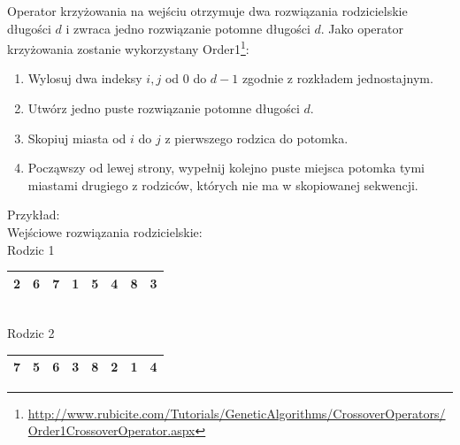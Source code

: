 \documentclass[12pt, a4paper]{article}
\begin{document}
Operator krzyżowania na wejściu otrzymuje dwa rozwiązania rodzicielskie długości $d$ i zwraca jedno rozwiązanie potomne długości $d$. 
Jako operator krzyżowania zostanie wykorzystany 
Order1\footnote{\url{http://www.rubicite.com/Tutorials/GeneticAlgorithms/CrossoverOperators/Order1CrossoverOperator.aspx}}:
\begin{enumerate}
 \item Wylosuj dwa indeksy $i, j$ od 0 do $d-1$ zgodnie z rozkładem jednostajnym.
 \item Utwórz jedno puste rozwiązanie potomne długości $d$.
 \item Skopiuj miasta od $i$ do $j$ z pierwszego rodzica do potomka.
 \item Począwszy od lewej strony, wypełnij kolejno puste miejsca potomka tymi miastami drugiego z rodziców, 
których nie ma w skopiowanej sekwencji.
\end{enumerate}

Przykład: \\

Wejściowe rozwiązania rodzicielskie: \\

Rodzic 1
\begin{tabular}{ | c | c | c | c | c | c | c | c |}
  \hline
  2 & 6 &  \cellcolor{green!25}7 & \cellcolor{green!25}1 & \cellcolor{green!25}5 & \cellcolor{green!25}4 & 8 & 3 \\ \hline
\end{tabular}\\
Rodzic 2
\begin{tabular}{ | c | c | c | c | c | c | c | c |}
  \hline
  7 & 5 & 6 & 3 & 8 & 2 & 1 & 4 \\ \hline
\end{tabular}
\end{document}
